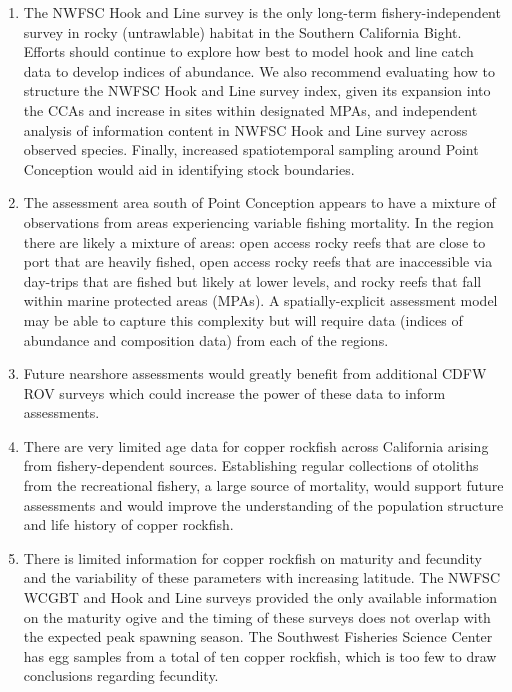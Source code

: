 \documentclass[11pt,
  english,
  letterpaper,
]{article}
\begin{document}
\begin{enumerate}

  \item  The NWFSC Hook and Line survey is the only long-term fishery-independent survey in rocky (untrawlable) habitat in the Southern California Bight. Efforts should continue to explore how best to model hook and line catch data to develop indices of abundance. We also recommend evaluating how to structure the NWFSC Hook and Line survey index, given its expansion into the CCAs and increase in sites within designated MPAs, and independent analysis of information content in NWFSC Hook and Line survey across observed species. Finally, increased spatiotemporal sampling around Point Conception would aid in identifying stock boundaries.

    \item The assessment area south of Point Conception appears to have a mixture of observations from areas experiencing variable fishing mortality. In the region there are likely a mixture of areas: open access rocky reefs that are close to port that are heavily fished, open access rocky reefs that are inaccessible via day-trips that are fished but likely at lower levels, and rocky reefs that fall within marine protected areas (MPAs). A spatially-explicit assessment model may be able to capture this complexity but will require data (indices of abundance and composition data) from each of the regions. 
    
    \item Future nearshore assessments would greatly benefit from additional CDFW ROV surveys which could increase the power of these data to inform assessments.

    \item There are very limited age data for copper rockfish across California arising from fishery-dependent sources. Establishing regular collections of otoliths from the recreational fishery, a large source of mortality, would support future assessments and would improve the understanding of the population structure and life history of copper rockfish. 

    \item There is limited information for copper rockfish on maturity and fecundity and the variability of these parameters with increasing latitude.  The NWFSC WCGBT and Hook and Line surveys provided the only available information on the maturity ogive and the timing of these surveys does not overlap with the expected peak spawning season. The Southwest Fisheries Science Center has egg samples from a total of ten copper rockfish, which is too few to draw conclusions regarding fecundity.


\end{enumerate}
\end{document}
